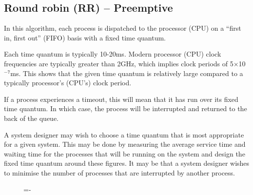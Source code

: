\documentclass[a4paper]{systems-software}
\begin{document}
\subsection*{Round robin (RR) – Preemptive}

In this algorithm, each process is dispatched to the processor (CPU) on a “first in, first out” (FIFO) basis with a fixed time quantum.

Each time quantum is typically 10-20ms. Modern processor (CPU) clock frequencies are typically greater than 2GHz, which implies clock periods of 5×10$^{-7}$ms. This shows that the given time quantum is relatively large compared to a typically processor’s (CPU’s) clock period.

If a process experiences a timeout, this will mean that it has run over its fixed time quantum. In which case, the process will be interrupted and returned to the back of the queue.

A system designer may wish to choose a time quantum that is most appropriate for a given system. This may be done by measuring the average service time and waiting time for the processes that will be running on the system and design the fixed time quantum around these figures. It may be that a system designer wishes to minimise the number of processes that are interrupted by another process.

\begin{figure}[H]
  \lineskip=-\fboxrule
\end{figure}
\end{document}
